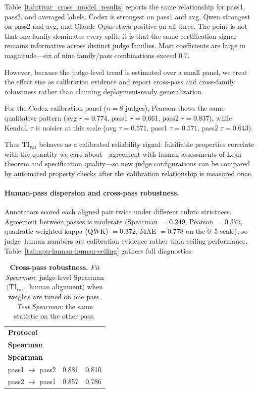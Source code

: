 \documentclass{article}
\begin{document}
Table~\ref{tab:tivar_cross_model_results} reports the same relationship for pass1, pass2, and averaged labels. Codex is strongest on pass1 and avg, Qwen strongest on pass2 and avg, and Claude Opus stays positive on all three. The point is not that one family dominates every split; it is that the same certification signal remains informative across distinct judge families. Most coefficients are large in magnitude---six of nine family/pass combinations exceed \(0.7\).

However, because the judge-level trend is estimated over a small panel, we treat the effect size as calibration evidence and report cross-pass and cross-family robustness rather than claiming deployment-ready generalization.

For the Codex calibration panel (\(n=8\) judges), Pearson shows the same qualitative pattern (avg \(r=0.774\), pass1 \(r=0.661\), pass2 \(r=0.837\)), while Kendall \(\tau\) is noisier at this scale (avg \(\tau=0.571\), pass1 \(\tau=0.571\), pass2 \(\tau=0.643\)).

Thus \(\mathrm{TI}_{\mathrm{var}}\) behaves as a calibrated reliability signal: falsifiable properties correlate with the quantity we care about---agreement with human assessments of Lean theorem and specification quality---so new judge configurations can be compared by automated property checks after the calibration relationship is measured once.

\paragraph{Human-pass dispersion and cross-pass robustness.}
Annotators scored each aligned pair twice under different rubric strictness. Agreement between passes is moderate (Spearman \(=0.249\), Pearson \(=0.375\), quadratic-weighted kappa (QWK) \(=0.372\), MAE \(=0.778\) on the \(0\)--\(5\) scale), so judge--human numbers are calibration evidence rather than ceiling performance. Table~\ref{tab:app-human-human-ceiling} gathers full diagnostics.

\begin{table}[t]
  \centering
  \small
  \begin{tabular}{lcc}
    \toprule
    \textbf{Protocol}           & \makecell{\textbf{Fit}         \\ \textbf{Spearman}}  & \makecell{\textbf{Test} \\ \textbf{Spearman}} \\
    \midrule
    pass1 \(\rightarrow\) pass2 & 0.881                  & 0.810 \\
    pass2 \(\rightarrow\) pass1 & 0.857                  & 0.786 \\
    \bottomrule
  \end{tabular}
  \caption{\textbf{Cross-pass robustness.}
  \emph{Fit Spearman}: judge-level Spearman\((\mathrm{TI}_{\mathrm{var}},\) human alignment\()\) when weights are tuned on one pass.
  \emph{Test Spearman}: the same statistic on the other pass.}
  \label{tab:cross_pass_generalization}
\end{table}
\end{document}

